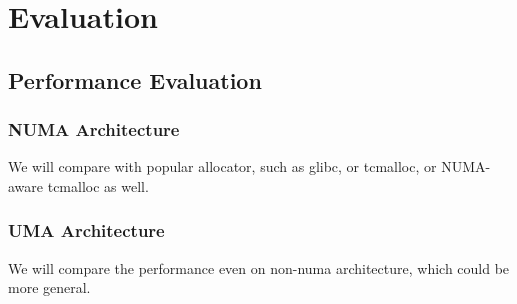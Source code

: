 \section{Evaluation}

\subsection{Performance Evaluation}

\subsubsection{NUMA Architecture}
We will compare with popular allocator, such as glibc, or tcmalloc, or NUMA-aware tcmalloc as well. 

\subsubsection{UMA Architecture}
We will compare the performance even on non-numa architecture, which could be more general. 
